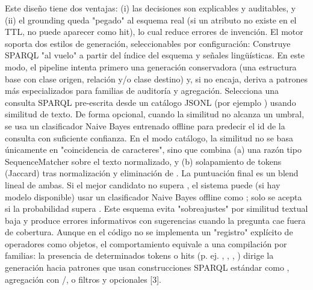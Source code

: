 {}Este diseño tiene dos ventajas: (i) las decisiones son explicables y auditables, y (ii) el grounding queda "pegado" al esquema real (si un atributo no existe en el TTL, no puede aparecer como hit), lo cual reduce errores de invención.\markdownRendererInterblockSeparator
{}\markdownRendererInterblockSeparator
{}El motor soporta dos estilos de generación, seleccionables por configuración:\markdownRendererInterblockSeparator
{}\markdownRendererUlBeginTight
\markdownRendererUlItem {} Construye SPARQL "al vuelo" a partir del índice del esquema y señales lingüísticas. En este modo, el pipeline intenta primero una generación  conservadora (una estructura base con clase origen, relación y/o clase destino) y, si no encaja, deriva a patrones más especializados para familias de auditoría y agregación.\markdownRendererUlItemEnd 
\markdownRendererUlItem {} Selecciona una consulta SPARQL pre-escrita desde un catálogo JSONL (por ejemplo ) usando similitud de texto. De forma opcional, cuando la similitud no alcanza un umbral, se usa un clasificador Naive Bayes entrenado offline para predecir el id de la consulta con suficiente confianza.\markdownRendererUlItemEnd 
\markdownRendererUlEndTight \markdownRendererInterblockSeparator
{}En el modo catálogo, la similitud no se basa únicamente en "coincidencia de caracteres", sino que combina (a) una razón tipo SequenceMatcher sobre el texto normalizado, y (b) solapamiento de tokens (Jaccard) tras normalización y eliminación de . La puntuación final es un blend lineal de ambas. Si el mejor candidato no supera , el sistema puede (si hay modelo disponible) usar un clasificador Naive Bayes offline como ; solo se acepta si la probabilidad supera . Este esquema evita "sobreajustes" por similitud textual baja y produce errores informativos con sugerencias cuando la pregunta cae fuera de cobertura.\markdownRendererInterblockSeparator
{}Aunque en el código no se implementa un "registro" explícito de operadores como objetos, el comportamiento equivale a una compilación por familias: la presencia de determinados tokens o hits (p. ej. , , , ) dirige la generación hacia patrones que usan construcciones SPARQL estándar como , agregación con /, o filtros y opcionales [3].\markdownRendererInterblockSeparator
